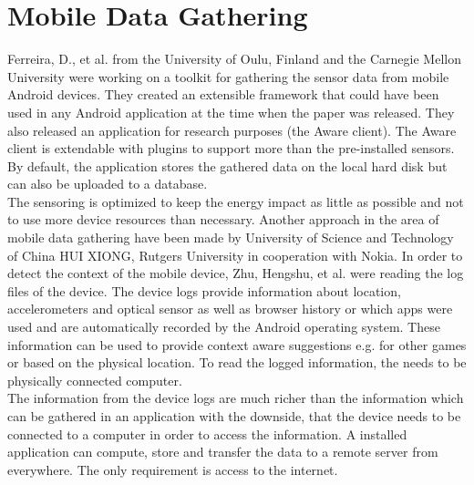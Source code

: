 \section{Mobile Data Gathering}
Ferreira, D., et al. \cite{ferreira2015aware} from the University of Oulu, Finland and the Carnegie Mellon University were working on a toolkit for gathering the sensor data from mobile Android devices. They created an extensible framework that could have been used in any Android application at the time when the paper was released. They also released an application for research purposes (the Aware client). The Aware client is extendable with plugins to support more than the pre-installed sensors. By default, the application stores the gathered data on the local hard disk but can also be uploaded to a database.\\
The sensoring is optimized to keep the energy impact as little as possible and not to use more device resources than necessary.
\bigbreak
Another approach in the area of mobile data gathering have been made by University of Science and Technology of China HUI XIONG, Rutgers University in cooperation with Nokia. In order to detect the context of the mobile device, Zhu, Hengshu, et al. \cite{zhu2015mining} were reading the log files of the device. The device logs provide information about location, accelerometers and optical sensor as well as browser history or which apps were used and are automatically recorded by the Android operating system. These information can be used to provide context aware suggestions e.g. for other games or based on the physical location. To read the logged information, the needs to be physically connected computer.\\
The information from the device logs are much richer than the information which can be gathered in an application with the downside, that the device needs to be connected to a computer in order to access the information. A installed application can compute, store and transfer the data  to a remote server from everywhere. The only requirement is access to the internet. 

